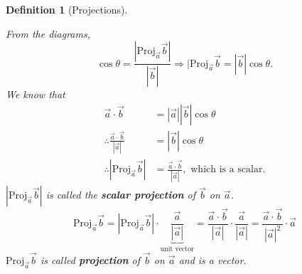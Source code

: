 \documentclass[12pt,a4paper]{article}
\newtheorem{df}{Definition}[subsection]
\def\Proj{\mathrm{Proj}}
\def\veca{\vec{a}}
\def\vecb{\vec{b}}
\begin{document}
\begin{df}[Projections]
\begin{center}
	\end{center}
	From the diagrams, \[\cos\theta=\frac{|\Proj_{\veca}\vecb|}{|\vecb|}\Longrightarrow|\Proj_{\veca}\vecb=\boxed{|\vecb|\cos\theta}.\]
	We know that \[\begin{aligned}
		\veca\cdot\vecb&=|\veca||\vecb|\cos\theta\\
		\therefore\frac{\veca\cdot\vecb}{|\veca|}&=\boxed{|\vecb|\cos\theta}\\
		\therefore |\Proj_{\veca}\vecb|&=\frac{\veca\cdot\vecb}{|\veca|},\text{ which is a scalar.}
	\end{aligned}\]
	$|\Proj_{\veca}\vecb|$ is called the \textbf{scalar projection} of $\vecb$ on $\veca$.
	\[\Proj_{\veca}\vecb=|\Proj_{\veca}\vecb|\cdot\underbrace{\frac{\veca}{|\veca|}}_{\text{unit vector}}=\frac{\veca\cdot\vecb}{|\veca|}\cdot\frac{\veca}{|\veca|}=\frac{\veca\cdot\vecb}{|\veca|^2}\cdot\veca\]
	$\Proj_{\veca}\vecb$ is called \textbf{projection} of $\vecb$ on $\veca$ and is a vector. 
\end{df}
\end{document}
